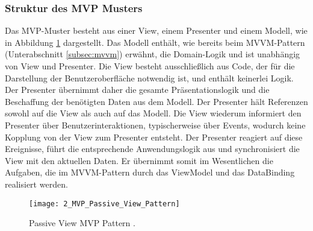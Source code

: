 \subsubsection{Struktur des MVP Musters}
Das MVP-Muster besteht aus einer View, einem Presenter und einem Modell, wie in Abbildung \ref{fig:mvp_pattern} dargestellt. Das Modell enthält, wie bereits beim MVVM-Pattern (Unterabschnitt \ref{subsec:mvvm}) erwähnt, die Domain-Logik und ist unabhängig von View und Presenter. 
Die View besteht ausschließlich aus Code, der für die Darstellung der Benutzeroberfläche notwendig ist, und enthält keinerlei Logik. Der Presenter übernimmt daher die gesamte Präsentationslogik und die Beschaffung der benötigten Daten aus dem Modell. Der Presenter hält Referenzen sowohl auf die View als auch auf das Modell. Die View wiederum informiert den Presenter über Benutzerinteraktionen, typischerweise über Events, wodurch keine Kopplung von der View zum Presenter entsteht. Der Presenter reagiert auf diese Ereignisse, führt die entsprechende Anwendungslogik aus und synchronisiert die View mit den aktuellen Daten. Er übernimmt somit im Wesentlichen die Aufgaben, die im MVVM-Pattern durch das ViewModel und das DataBinding realisiert werden.

\begin{figure}[H]
    \centering
    \texttt{[image: 2\_MVP\_Passive\_View\_Pattern]}
    \caption{Passive View MVP Pattern \cite{mvp_ieee}.}
    \label{fig:mvp_pattern}
\end{figure}








